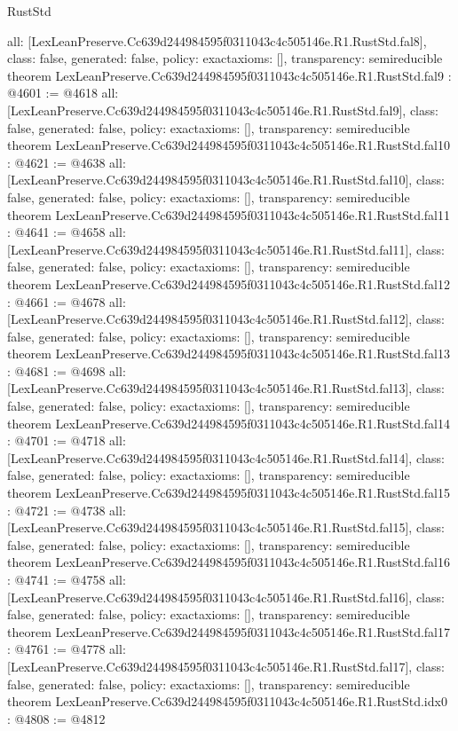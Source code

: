 \begin{lexlean}{RustStd}
\begin{coremodule}
{  all: [LexLeanPreserve.Cc639d244984595f0311043c4c505146e.R1.RustStd.fal8],
  class: false,
  generated: false,
  policy: exact{axioms: []},
  transparency: semireducible
}
theorem LexLeanPreserve.Cc639d244984595f0311043c4c505146e.R1.RustStd.fal9 : @4601 := @4618 {
  all: [LexLeanPreserve.Cc639d244984595f0311043c4c505146e.R1.RustStd.fal9],
  class: false,
  generated: false,
  policy: exact{axioms: []},
  transparency: semireducible
}
theorem LexLeanPreserve.Cc639d244984595f0311043c4c505146e.R1.RustStd.fal10 : @4621 := @4638 {
  all: [LexLeanPreserve.Cc639d244984595f0311043c4c505146e.R1.RustStd.fal10],
  class: false,
  generated: false,
  policy: exact{axioms: []},
  transparency: semireducible
}
theorem LexLeanPreserve.Cc639d244984595f0311043c4c505146e.R1.RustStd.fal11 : @4641 := @4658 {
  all: [LexLeanPreserve.Cc639d244984595f0311043c4c505146e.R1.RustStd.fal11],
  class: false,
  generated: false,
  policy: exact{axioms: []},
  transparency: semireducible
}
theorem LexLeanPreserve.Cc639d244984595f0311043c4c505146e.R1.RustStd.fal12 : @4661 := @4678 {
  all: [LexLeanPreserve.Cc639d244984595f0311043c4c505146e.R1.RustStd.fal12],
  class: false,
  generated: false,
  policy: exact{axioms: []},
  transparency: semireducible
}
theorem LexLeanPreserve.Cc639d244984595f0311043c4c505146e.R1.RustStd.fal13 : @4681 := @4698 {
  all: [LexLeanPreserve.Cc639d244984595f0311043c4c505146e.R1.RustStd.fal13],
  class: false,
  generated: false,
  policy: exact{axioms: []},
  transparency: semireducible
}
theorem LexLeanPreserve.Cc639d244984595f0311043c4c505146e.R1.RustStd.fal14 : @4701 := @4718 {
  all: [LexLeanPreserve.Cc639d244984595f0311043c4c505146e.R1.RustStd.fal14],
  class: false,
  generated: false,
  policy: exact{axioms: []},
  transparency: semireducible
}
theorem LexLeanPreserve.Cc639d244984595f0311043c4c505146e.R1.RustStd.fal15 : @4721 := @4738 {
  all: [LexLeanPreserve.Cc639d244984595f0311043c4c505146e.R1.RustStd.fal15],
  class: false,
  generated: false,
  policy: exact{axioms: []},
  transparency: semireducible
}
theorem LexLeanPreserve.Cc639d244984595f0311043c4c505146e.R1.RustStd.fal16 : @4741 := @4758 {
  all: [LexLeanPreserve.Cc639d244984595f0311043c4c505146e.R1.RustStd.fal16],
  class: false,
  generated: false,
  policy: exact{axioms: []},
  transparency: semireducible
}
theorem LexLeanPreserve.Cc639d244984595f0311043c4c505146e.R1.RustStd.fal17 : @4761 := @4778 {
  all: [LexLeanPreserve.Cc639d244984595f0311043c4c505146e.R1.RustStd.fal17],
  class: false,
  generated: false,
  policy: exact{axioms: []},
  transparency: semireducible
}
theorem LexLeanPreserve.Cc639d244984595f0311043c4c505146e.R1.RustStd.idx0 : @4808 := @4812 {
}
\end{coremodule}
\end{lexlean}

